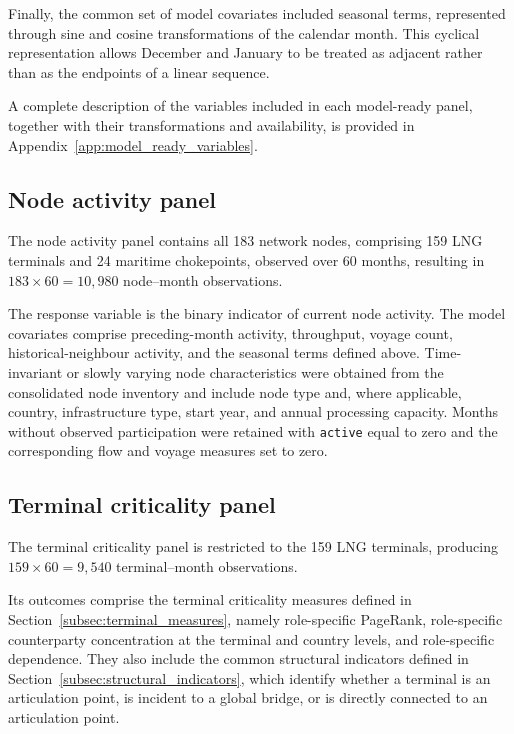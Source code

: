 \documentclass[pdftex,12pt,openright,a4paper,oneside]{book}
\begin{document}
Finally, the common set of model covariates included seasonal terms, represented through sine and cosine transformations of the calendar month. This cyclical representation allows December and January to be treated as adjacent rather than as the endpoints of a linear sequence.

A complete description of the variables included in each model-ready panel, together with their transformations and availability, is provided in Appendix~\ref{app:model_ready_variables}.

\subsection{Node activity panel}
\label{subsec:activity_panel}
The node activity panel contains all 183 network nodes, comprising 159 LNG terminals and 24 maritime chokepoints, observed over 60 months, resulting in \(183 \times 60 = 10{,}980\) node--month observations.

The response variable is the binary indicator of current node activity. 
The model covariates comprise preceding-month activity, throughput, voyage count, historical-neighbour activity, and the seasonal terms defined above. 
Time-invariant or slowly varying node characteristics were obtained from the consolidated node inventory and include node type and, where applicable, country, infrastructure type, start year, and annual processing capacity. 
Months without observed participation were retained with \texttt{active} equal to zero and the corresponding flow and voyage measures set to zero.

\subsection{Terminal criticality panel}
\label{subsec:terminal_panel}
The terminal criticality panel is restricted to the 159 LNG terminals, producing \(159 \times 60 = 9{,}540\) terminal--month observations.

Its outcomes comprise the terminal criticality measures defined in Section~\ref{subsec:terminal_measures}, namely role-specific PageRank, role-specific counterparty concentration at the terminal and country levels, and role-specific dependence. They also include the common structural indicators defined in Section~\ref{subsec:structural_indicators}, which identify whether a terminal is an articulation point, is incident to a global bridge, or is directly connected to an articulation point.
\end{document}
